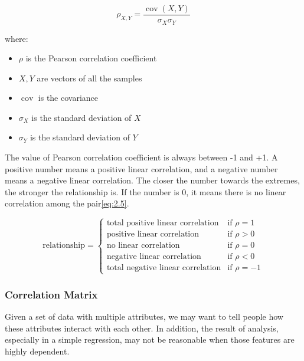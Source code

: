 \documentclass[11pt]{article} %
\theoremstyle{plain}
\theoremstyle{definition}
\begin{document}
{
  \begin{equation}
    \label{eq:2.4}
    \tag{2.4}
    \rho _{X,Y}={\frac {\operatorname {cov} (X,Y)}{\sigma _{X}\sigma _{Y}}}
  \end{equation}

  \footnotesize
  where:
  \begin{itemize}[label=-, leftmargin=4em, itemsep=0.1em]
    \item ${\rho}$ is the Pearson correlation coefficient
    \item ${X, Y}$ are vectors of all the samples
    \item $\operatorname {cov}$ is the covariance
    \item ${\sigma}_{X}$ is the standard deviation of ${X}$
    \item ${\sigma}_{Y}$ is the standard deviation of ${Y}$
  \end{itemize}
}

The value of Pearson correlation coefficient is always between -1 and +1. A positive number means a positive linear correlation, and a negative number means a negative linear correlation. The closer the number towards the extremes, the stronger the relationship is. If the number is 0, it means there is no linear correlation among the pair\eqref{eq:2.5}.

\begin{equation}
  \label{eq:2.5}
  \tag{2.5}
  \text{relationship} =
  \begin{cases}
    \text{total positive linear correlation} & \text{if } \rho = 1 \\
    \text{positive linear correlation} & \text{if } \rho > 0 \\
    \text{no linear correlation} & \text{if } \rho = 0 \\
    \text{negative linear correlation} & \text{if } \rho < 0 \\
    \text{total negative linear correlation} & \text{if } \rho = -1
  \end{cases}
\end{equation}

\subsubsection{Correlation Matrix}

Given a set of data with multiple attributes, we may want to tell people how these attributes interact with each other. In addition, the result of analysis, especially in a simple regression, may not be reasonable when those features are highly dependent.
\end{document}
